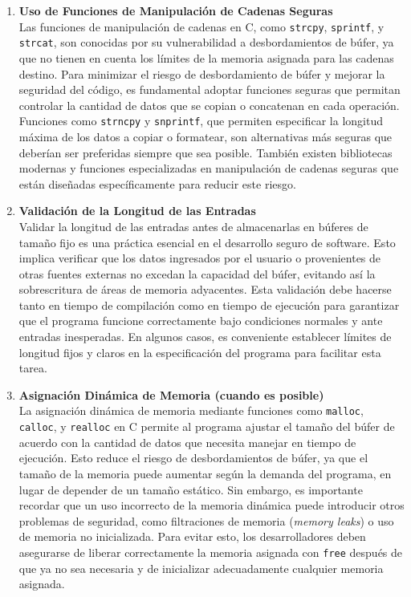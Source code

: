 \begin{enumerate}
    \item \textbf{Uso de Funciones de Manipulación de Cadenas Seguras}
    \\
    Las funciones de manipulación de cadenas en C, como \verb|strcpy|, \verb|sprintf|, y \verb|strcat|, son conocidas por su vulnerabilidad a desbordamientos de búfer, ya que no tienen en cuenta los límites de la memoria asignada para las cadenas destino. Para minimizar el riesgo de desbordamiento de búfer y mejorar la seguridad del código, es fundamental adoptar funciones seguras que permitan controlar la cantidad de datos que se copian o concatenan en cada operación. Funciones como \verb|strncpy| y \verb|snprintf|, que permiten especificar la longitud máxima de los datos a copiar o formatear, son alternativas más seguras que deberían ser preferidas siempre que sea posible. También existen bibliotecas modernas y funciones especializadas en manipulación de cadenas seguras que están diseñadas específicamente para reducir este riesgo.

    \item \textbf{Validación de la Longitud de las Entradas}
    \\
    Validar la longitud de las entradas antes de almacenarlas en búferes de tamaño fijo es una práctica esencial en el desarrollo seguro de software. Esto implica verificar que los datos ingresados por el usuario o provenientes de otras fuentes externas no excedan la capacidad del búfer, evitando así la sobrescritura de áreas de memoria adyacentes. Esta validación debe hacerse tanto en tiempo de compilación como en tiempo de ejecución para garantizar que el programa funcione correctamente bajo condiciones normales y ante entradas inesperadas. En algunos casos, es conveniente establecer límites de longitud fijos y claros en la especificación del programa para facilitar esta tarea.

    \item \textbf{Asignación Dinámica de Memoria (cuando es posible)}
    \\
    La asignación dinámica de memoria mediante funciones como \verb|malloc|, \verb|calloc|, y \verb|realloc| en C permite al programa ajustar el tamaño del búfer de acuerdo con la cantidad de datos que necesita manejar en tiempo de ejecución. Esto reduce el riesgo de desbordamientos de búfer, ya que el tamaño de la memoria puede aumentar según la demanda del programa, en lugar de depender de un tamaño estático. Sin embargo, es importante recordar que un uso incorrecto de la memoria dinámica puede introducir otros problemas de seguridad, como filtraciones de memoria (\textit{memory leaks}) o uso de memoria no inicializada. Para evitar esto, los desarrolladores deben asegurarse de liberar correctamente la memoria asignada con \verb|free| después de que ya no sea necesaria y de inicializar adecuadamente cualquier memoria asignada.


\end{enumerate}
